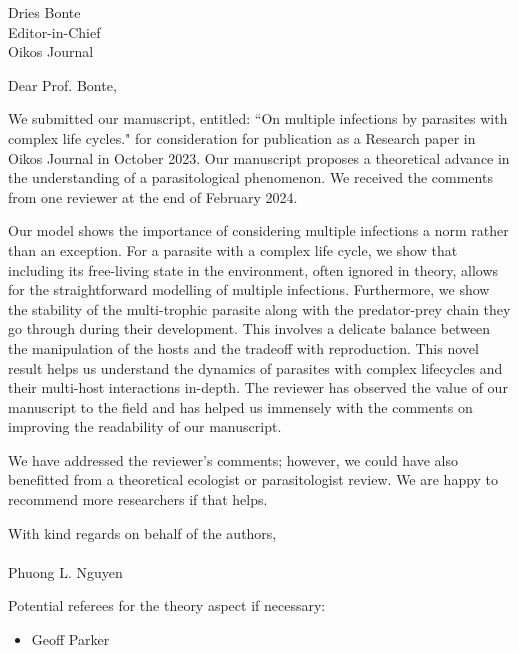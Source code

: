 \documentclass[10,DIN, pagenumber=false, parskip=half,fromalign=right, fromphone=false,fromemail=true, fromurl=false,fromlogo=true, fromrule=false]{scrlttr2}
\begin{document}
\sffamily

\begin{letter}{
\sffamily
\vspace{-0.4cm}
Dries Bonte \\
Editor-in-Chief\\
Oikos Journal
}
\opening{\sffamily \vspace{-1cm} Dear Prof. Bonte,}
\vspace{-0.3cm}

We submitted our manuscript, entitled: ``On multiple infections by parasites with complex life cycles." for consideration for publication as a Research paper in Oikos Journal in October 2023.
Our manuscript proposes a theoretical advance in the understanding of a parasitological phenomenon.
We received the comments from one reviewer at the end of February 2024.

Our model shows the importance of considering multiple infections a norm rather than an exception. 
For a parasite with a complex life cycle, we show that including its free-living state in the environment, often ignored in theory, allows for the straightforward modelling of multiple infections.
Furthermore, we show the stability of the multi-trophic parasite along with the predator-prey chain they go through during their development.
This involves a delicate balance between the manipulation of the hosts and the tradeoff with reproduction.
This novel result helps us understand the dynamics of parasites with complex lifecycles and their multi-host interactions in-depth. 
The reviewer has observed the value of our manuscript to the field and has helped us immensely with the comments on improving the readability of our manuscript.

We have addressed the reviewer's comments; however, we could have also benefitted from a theoretical ecologist or parasitologist review.
We are happy to recommend more researchers if that helps.

With kind regards on behalf of the authors,\\
\\
Phuong L. Nguyen


Potential referees for the theory aspect if necessary:

\begin{itemize}
	\item Geoff Parker
\end{itemize}

\end{letter}
\end{document}
